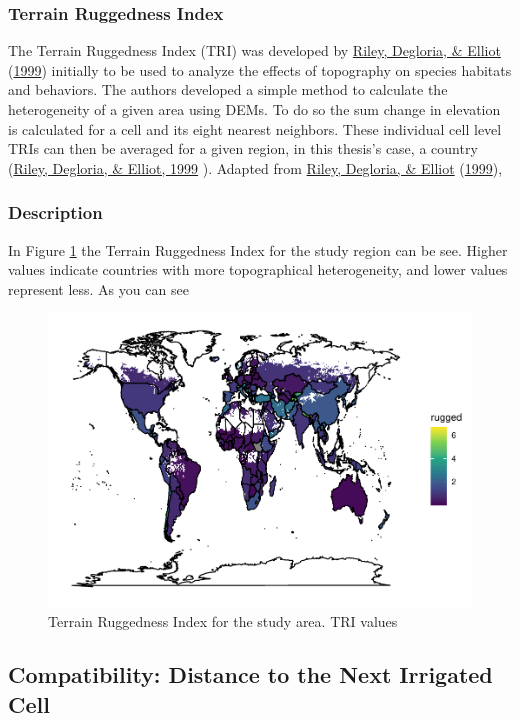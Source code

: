 \documentclass[12pt,twoside]{reedthesis}
\begin{document}
\hypertarget{TRI}{%
\subsubsection{Terrain Ruggedness Index}\label{TRI}}

The Terrain Ruggedness Index (TRI) was developed by \protect\hyperlink{ref-rileyTerrainRuggednessIndex1999}{Riley, Degloria, \& Elliot} (\protect\hyperlink{ref-rileyTerrainRuggednessIndex1999}{1999}) initially to be used to analyze the effects of topography on species habitats and behaviors. The authors developed a simple method to calculate the heterogeneity of a given area using DEMs. To do so the sum change in elevation is calculated for a cell and its eight nearest neighbors. These individual cell level TRIs can then be averaged for a given region, in this thesis's case, a country (\protect\hyperlink{ref-rileyTerrainRuggednessIndex1999}{Riley, Degloria, \& Elliot, 1999} ). Adapted from \protect\hyperlink{ref-rileyTerrainRuggednessIndex1999}{Riley, Degloria, \& Elliot} (\protect\hyperlink{ref-rileyTerrainRuggednessIndex1999}{1999}),

\hypertarget{ruggeddesc}{%
\subsubsection{Description}\label{ruggeddesc}}

In Figure \ref{fig:TRI} the Terrain Ruggedness Index for the study region can be see. Higher values indicate countries with more topographical heterogeneity, and lower values represent less. As you can see
\begin{figure}
\centering
\includegraphics{thesis_files/figure-latex/TRI-1.pdf}
\caption{\label{fig:TRI}Terrain Ruggedness Index for the study area. TRI values}
\end{figure}
\hypertarget{dist}{%
\subsection{Compatibility: Distance to the Next Irrigated Cell}\label{dist}}
\end{document}
